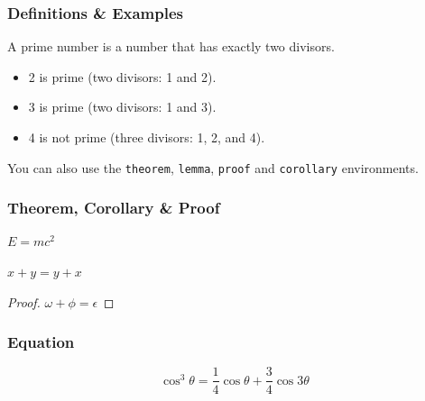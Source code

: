 \documentclass[
	11pt, %
]{beamer}
\begin{document}
\begin{frame}
	\frametitle{Definitions \& Examples}
	
	\begin{definition}
		A \alert{prime number} is a number that has exactly two divisors.
	\end{definition}
	
	\smallskip %
	
	\begin{example}
		\begin{itemize}
			\item 2 is prime (two divisors: 1 and 2).
			\item 3 is prime (two divisors: 1 and 3).
			\item 4 is not prime (\alert{three} divisors: 1, 2, and 4).
		\end{itemize}
	\end{example}
	
	\smallskip %
	
	You can also use the \texttt{theorem}, \texttt{lemma}, \texttt{proof} and \texttt{corollary} environments.
\end{frame}


\begin{frame}
	\frametitle{Theorem, Corollary \& Proof}
	
	\begin{theorem}
		$E = mc^2$
	\end{theorem}
	
	\begin{corollary}
		$x + y = y + x$
	\end{corollary}
	
	\begin{proof}
		$\omega + \phi = \epsilon$
	\end{proof}
\end{frame}


\begin{frame}
	\frametitle{Equation}

	\begin{equation}
		\cos^3 \theta =\frac{1}{4}\cos\theta+\frac{3}{4}\cos 3\theta
	\end{equation}
\end{frame}

\end{document}
